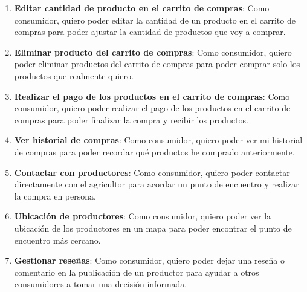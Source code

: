 \begin{enumerate}[HU-1:]
\item \textbf{Editar cantidad de producto en el carrito de compras}: Como consumidor, quiero poder editar la cantidad de un producto en el carrito de compras para poder ajustar la cantidad de productos que voy a comprar.

\item \textbf{Eliminar producto del carrito de compras}: Como consumidor, quiero poder eliminar productos del carrito de compras para poder comprar solo los productos que realmente quiero.

\item \textbf{Realizar el pago de los productos en el carrito de compras}: Como consumidor, quiero poder realizar el pago de los productos en el carrito de compras para poder finalizar la compra y recibir los productos.

\item \textbf{Ver historial de compras}: Como consumidor, quiero poder ver mi historial de compras para poder recordar qué productos he comprado anteriormente.

\item \textbf{Contactar con productores}: Como consumidor, quiero poder contactar directamente con el agricultor para acordar un punto de encuentro y realizar la compra en persona.

\item \textbf{Ubicación de productores}: Como consumidor, quiero poder ver la ubicación de los productores en un mapa para poder encontrar el punto de encuentro más cercano.

\item \textbf{Gestionar reseñas}: Como consumidor, quiero poder dejar una reseña o comentario en la publicación de un productor para ayudar a otros consumidores a tomar una decisión informada.

\end{enumerate}